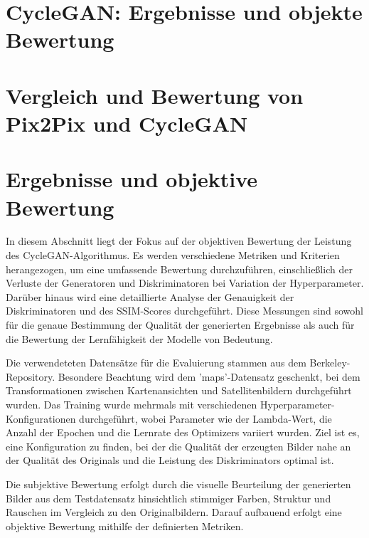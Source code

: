 \newpage
\section{CycleGAN: Ergebnisse und objekte Bewertung}
\section{Vergleich und Bewertung von Pix2Pix und CycleGAN}

\section{Ergebnisse und objektive Bewertung}
In diesem Abschnitt liegt der Fokus auf der objektiven Bewertung der Leistung des CycleGAN-Algorithmus. Es werden verschiedene Metriken und Kriterien herangezogen, um eine umfassende Bewertung durchzuführen, einschließlich der Verluste der Generatoren und Diskriminatoren bei Variation der Hyperparameter. Darüber hinaus wird eine detaillierte Analyse der Genauigkeit der Diskriminatoren und des SSIM-Scores durchgeführt. Diese Messungen sind sowohl für die genaue Bestimmung der Qualität der generierten Ergebnisse als auch für die Bewertung der Lernfähigkeit der Modelle von Bedeutung.

Die verwendeteten Datensätze für die Evaluierung stammen aus dem Berkeley-Repository. Besondere Beachtung wird dem 'maps'-Datensatz geschenkt, bei dem Transformationen zwischen Kartenansichten und Satellitenbildern durchgeführt wurden. Das Training wurde mehrmals mit verschiedenen Hyperparameter-\\Konfigurationen durchgeführt, wobei Parameter wie der Lambda-Wert, die Anzahl der Epochen und die Lernrate des Optimizers variiert wurden. Ziel ist es, eine Konfiguration zu finden, bei der die Qualität der erzeugten Bilder nahe an der Qualität des Originals und die Leistung des Diskriminators optimal ist.

Die subjektive Bewertung erfolgt durch die visuelle Beurteilung der generierten Bilder aus dem Testdatensatz hinsichtlich stimmiger Farben, Struktur und Rauschen im Vergleich zu den Originalbildern. Darauf aufbauend erfolgt eine objektive Bewertung mithilfe der definierten Metriken.


